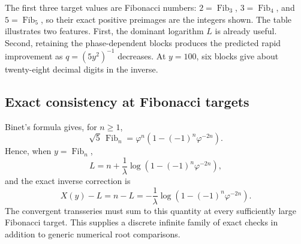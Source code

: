 \documentclass[11pt,oneside]{article}
\numberwithin{equation}{section}
\newcommand{\Fib}{\operatorname{Fib}}
\begin{document}
\begin{table}[htbp]
\centering
\caption{Absolute inverse errors \(E_N(y)=|X_N(y)-X(y)|\).}
\label{tab:numerical-errors}
\end{table}

The first three target values are Fibonacci numbers:
\(2=\Fib_3\), \(3=\Fib_4\), and \(5=\Fib_5\), so their exact positive
preimages are the integers shown.  The table illustrates two features.
First, the dominant logarithm \(L\) is already useful.  Second, retaining the
phase-dependent blocks produces the predicted rapid improvement as
\(q=(5y^2)^{-1}\) decreases.  At \(y=100\), six blocks give about twenty-eight
decimal digits in the inverse.

\subsection{Exact consistency at Fibonacci targets}

Binet's formula gives, for \(n\ge1\),
\begin{equation}
  \sqrt5\,\Fib_n
  =\varphi^n\left(1-(-1)^n\varphi^{-2n}\right).
  \label{eq:Binet-factor}
\end{equation}
Hence, when \(y=\Fib_n\),
\begin{equation}
  L=n+\frac1\lambda\log\left(1-(-1)^n\varphi^{-2n}\right),
  \label{eq:L-at-Fib}
\end{equation}
and the exact inverse correction is
\begin{equation}
  X(y)-L=n-L
  =-\frac1\lambda\log\left(1-(-1)^n\varphi^{-2n}\right).
  \label{eq:exact-correction-at-Fib}
\end{equation}
The convergent transseries must sum to this quantity at every sufficiently
large Fibonacci target.  This supplies a discrete infinite family of exact
checks in addition to generic numerical root comparisons.
\end{document}
